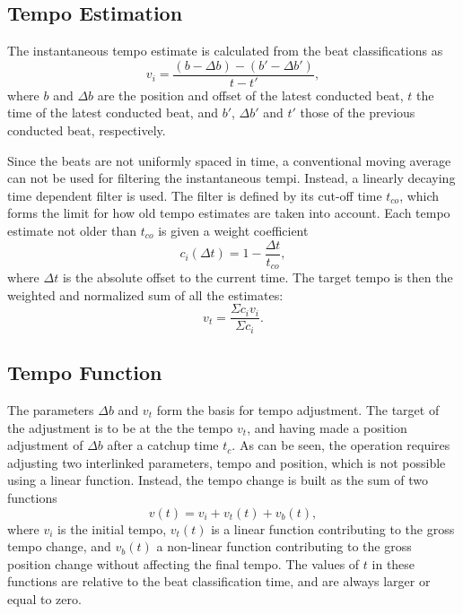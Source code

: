 \subsection{Tempo Estimation}

The instantaneous tempo estimate is calculated from
the beat classifications as
\begin{equation}
v_i = \frac{(b - \Delta b) - (b' - \Delta b')}{t - t'},
\end{equation}
where $b$ and $\Delta b$ are the position and offset of
the latest conducted beat,
$t$ the time of the latest conducted beat,
and $b'$, $\Delta b'$ and $t'$ those of
the previous conducted beat, respectively.

Since the beats are not uniformly spaced in time,
a conventional moving average can not be used
for filtering the instantaneous tempi.
Instead, a linearly decaying time dependent filter is used.
The filter is defined by its cut-off time $t_{co}$,
which forms the limit for how old tempo estimates
are taken into account.
Each tempo estimate not older than $t_{co}$ is given a weight coefficient
\begin{equation}
c_i(\Delta t) = 1 - \frac{\Delta t}{t_{co}},
\end{equation}
where $\Delta t$ is the absolute offset to the current time.
The target tempo is then the
weighted and normalized sum of all the estimates:
\begin{equation}
v_t = \frac{\Sigma c_i v_i}{\Sigma c_i}.
\end{equation}


\subsection{Tempo Function}
\label{sec:tempo_function}

The parameters $\Delta b$ and $v_t$
form the basis for tempo adjustment.
The target of the adjustment is to be
at the the tempo $v_t$,
and having made a position adjustment of $\Delta b$
after a catchup time $t_c$.
As can be seen,
the operation requires adjusting two interlinked parameters,
tempo and position,
which is not possible using a linear function.
Instead, the tempo change is built as the sum of two functions
\begin{equation}
v(t) = v_i + v_t(t) + v_b(t),
\end{equation}
where $v_i$ is the initial tempo,
$v_t(t)$ is a linear function
contributing to the gross tempo change,
and $v_b(t)$ a non-linear function contributing
to the gross position change
without affecting the final tempo.
The values of $t$ in these functions are relative to the
beat classification time,
and are always larger or equal to zero.

